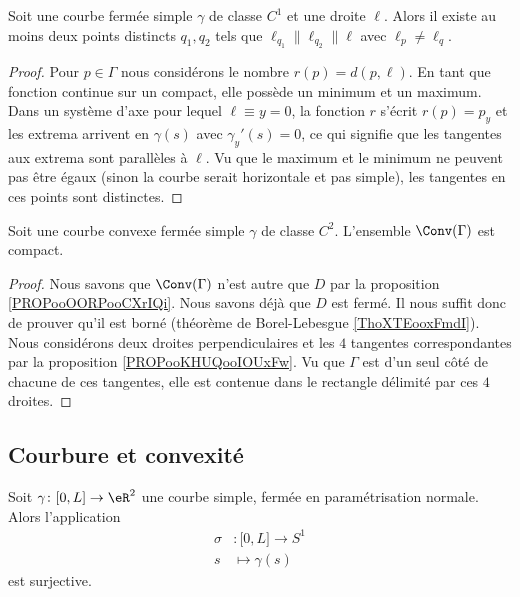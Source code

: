 \begin{proposition}     \label{PROPooKHUQooIOUxFw}
    Soit une courbe fermée simple \( \gamma\) de classe \( C^1\) et une droite \( \ell\). Alors il existe au moins deux points distincts \( q_1,q_2\) tels que \( \ell_{q_1}\parallel \ell_{q_2}\parallel\ell\) avec \( \ell_p\neq \ell_q\).
\end{proposition}

\begin{proof}
    Pour \( p\in \Gamma\) nous considérons le nombre \( r(p)=d(p,\ell)\). En tant que fonction continue sur un compact, elle possède un minimum et un maximum. Dans un système d'axe pour lequel \( \ell\equiv y=0\), la fonction \( r\) s'écrit \( r(p)=p_y\) et les extrema arrivent en \( \gamma(s)\) avec \( \gamma_y'(s)=0\), ce qui signifie que les tangentes aux extrema sont parallèles à \( \ell\). Vu que le maximum et le minimum ne peuvent pas être égaux (sinon la courbe serait horizontale et pas simple), les tangentes en ces points sont distinctes.
\end{proof}

\begin{corollary}
    Soit une courbe convexe fermée simple \( \gamma\) de classe \( C^2\). L'ensemble $\Conv(\Gamma)$ est compact.
\end{corollary}

\begin{proof}
    Nous savons que \( \Conv(\Gamma)\) n'est autre que \( D\) par la proposition \ref{PROPooOORPooCXrIQi}. Nous savons déjà que \( D\) est fermé. Il nous suffit donc de prouver qu'il est borné (théorème de Borel-Lebesgue \ref{ThoXTEooxFmdI}). Nous considérons deux droites perpendiculaires et les \( 4\) tangentes correspondantes par la proposition \ref{PROPooKHUQooIOUxFw}. Vu que \( \Gamma\) est d'un seul côté de chacune de ces tangentes, elle est contenue dans le rectangle délimité par ces \( 4\) droites.
\end{proof}

\subsection{Courbure et convexité}
\label{SUBSECooNJOLooYuGRjA}

\begin{lemma}       \label{LEMooHMFSooFlhanD}
    Soit \(   \gamma\colon \mathopen[ 0 , L \mathclose]\to \eR^2    \) une courbe simple, fermée en paramétrisation normale. Alors l'application
    \begin{equation}
        \begin{aligned}
            \sigma&\colon \mathopen[ 0 , L \mathclose]\to S^1\\
            s&\mapsto \gamma(s) 
        \end{aligned}
    \end{equation}
    est surjective.
\end{lemma}

